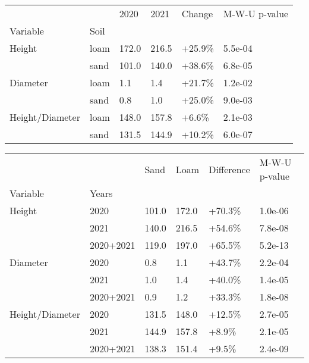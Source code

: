 \documentclass[11pt]{article}
\begin{document}
\begin{tabular}{llllll}
\toprule
                &      &   2020 &   2021 &  Change & M-W-U p-value \\
Variable & Soil &        &        &         &               \\
\midrule
Height & loam &  172.0 &  216.5 &  +25.9\% &       5.5e-04 \\
                & sand &  101.0 &  140.0 &  +38.6\% &       6.8e-05 \\
Diameter & loam &    1.1 &    1.4 &  +21.7\% &       1.2e-02 \\
                & sand &    0.8 &    1.0 &  +25.0\% &       9.0e-03 \\
Height/Diameter & loam &  148.0 &  157.8 &   +6.6\% &       2.1e-03 \\
                & sand &  131.5 &  144.9 &  +10.2\% &       6.0e-07 \\
\bottomrule
\end{tabular}

\begin{tabular}{llllll}
\toprule
                &           &   Sand &   Loam & Difference & M-W-U p-value \\
Variable & Years &        &        &            &               \\
\midrule
Height & 2020 &  101.0 &  172.0 &     +70.3\% &       1.0e-06 \\
                & 2021 &  140.0 &  216.5 &     +54.6\% &       7.8e-08 \\
                & 2020+2021 &  119.0 &  197.0 &     +65.5\% &       5.2e-13 \\
Diameter & 2020 &    0.8 &    1.1 &     +43.7\% &       2.2e-04 \\
                & 2021 &    1.0 &    1.4 &     +40.0\% &       1.4e-05 \\
                & 2020+2021 &    0.9 &    1.2 &     +33.3\% &       1.8e-08 \\
Height/Diameter & 2020 &  131.5 &  148.0 &     +12.5\% &       2.7e-05 \\
                & 2021 &  144.9 &  157.8 &      +8.9\% &       2.1e-05 \\
                & 2020+2021 &  138.3 &  151.4 &      +9.5\% &       2.4e-09 \\
\bottomrule
\end{tabular}
\end{document}
